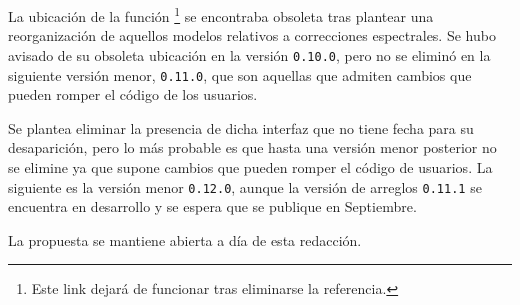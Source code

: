 La ubicación de la función \footnote{Este link dejará de funcionar tras eliminarse la referencia.} se encontraba obsoleta tras plantear una reorganización de aquellos modelos relativos a correcciones espectrales. Se hubo avisado de su obsoleta ubicación en la versión \texttt{0.10.0}, pero no se eliminó en la siguiente versión menor, \texttt{0.11.0}, que son aquellas que admiten cambios que pueden romper el código de los usuarios.

Se plantea eliminar la presencia de dicha interfaz que no tiene fecha para su desaparición, pero lo más probable es que hasta una versión menor posterior no se elimine ya que supone cambios que pueden romper el código de usuarios. La siguiente es la versión menor \texttt{0.12.0}, aunque la versión de arreglos \texttt{0.11.1} se encuentra en desarrollo y se espera que se publique en Septiembre.

La propuesta se mantiene abierta a día de esta redacción.
